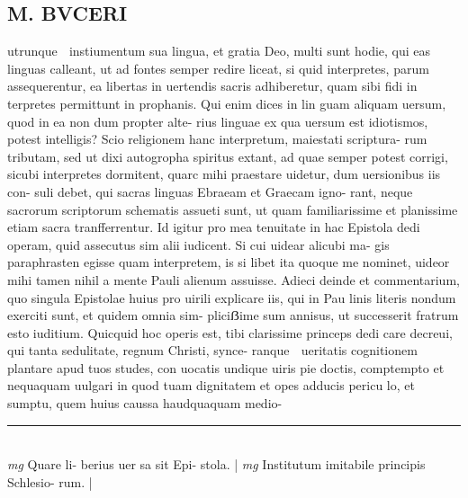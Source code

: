 \documentclass{article}
\begin{document}
\begin{pages}
\section*{M.  BVCERI }\pstart utrunque  instiumentum sua lingua, et gratia Deo, multi sunt hodie, qui eas linguas calleant, ut ad fontes semper redire liceat, si quid interpretes, parum assequerentur, ea libertas in uertendis sacris adhiberetur, quam sibi fidi in terpretes permittunt in prophanis. Qui enim dices in lin guam aliquam uersum, quod in ea non dum propter alte- rius linguae ex qua uersum est idiotismos, potest intelligis? Scio religionem hanc interpretum, maiestati scriptura- rum tributam, sed ut dixi autogropha spiritus extant, ad quae semper potest corrigi, sicubi interpretes dormitent, quarc mihi praestare uidetur, dum uersionibus iis con- suli debet, qui sacras linguas Ebraeam et Graecam igno- rant, neque  sacrorum scriptorum schematis assueti sunt, ut quam familiarissime et planissime etiam sacra tranfferrentur. Id igitur pro mea tenuitate in hac Epistola dedi operam, quid assecutus sim alii iudicent.  Si cui uidear alicubi ma- gis paraphrasten egisse quam interpretem, is si libet ita quoque  me nominet, uideor mihi tamen nihil a mente Pauli alienum assuisse. Adieci deinde et commentarium, quo singula Epistolae huius pro uirili explicare iis, qui in Pau linis literis nondum exerciti sunt, et quidem omnia sim- pliciẞime sum annisus, ut successerit fratrum esto iuditium.   \pend\pstart Quicquid hoc operis est, tibi clarissime princeps dedi care decreui, qui tanta sedulitate, regnum Christi, synce- ranque  ueritatis cognitionem plantare apud tuos studes, con uocatis undique  uiris pie doctis, comptempto et nequaquam uulgari in quod tuam dignitatem et opes adducis pericu lo, et sumptu, quem huius caussa haudquaquam medio-  \pend
\vspace{0.5cm}\noindent
\vspace{0.2cm}\rule{1cm}{0.2pt}\\ 
\hspace{0.2cm}\textit{mg}
\footnotesize Quare li- berius uer sa sit Epi- stola.  
\normalsize| 
\hspace{0.2cm}\textit{mg}
\footnotesize Institutum imitabile principis Schlesio- rum.  
\normalsize| 

\end{pages}
\end{document}
